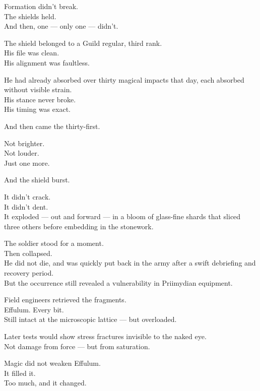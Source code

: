\documentclass[12pt]{article}
\begin{document}
Formation didn’t break.\\
The shields held.\\
And then, one — only one — didn’t.

\vspace{1em}

The shield belonged to a Guild regular, third rank.\\
His file was clean.\\
His alignment was faultless.

He had already absorbed over thirty magical impacts that day, each absorbed without visible strain.\\
His stance never broke.\\
His timing was exact.

And then came the thirty-first.

Not brighter.\\
Not louder.\\
Just one more.

And the shield burst.

\vspace{1em}

It didn’t crack.\\
It didn’t dent.\\
It exploded — out and forward — in a bloom of glass-fine shards that sliced three others before embedding in the stonework.

The soldier stood for a moment.\\
Then collapsed.\\
He did not die, and was quickly put back in the army after a swift debriefing and recovery period.\\
But the occurrence still revealed a vulnerability in Priimydian equipment.

\vspace{1em}

Field engineers retrieved the fragments.\\
Effulum. Every bit.\\
Still intact at the microscopic lattice — but overloaded.

Later tests would show stress fractures invisible to the naked eye.\\
Not damage from force — but from saturation.

\vspace{1em}

Magic did not weaken Effulum.\\
It filled it.\\
Too much, and it changed.
\end{document}
